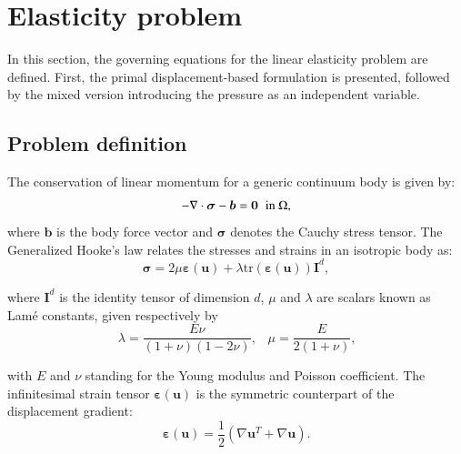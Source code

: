 \documentclass[english,11pt,3p,number,sort&compress]{elsarticle}
\begin{document}
\section{Elasticity problem \label{sec:Governing-equations}}

In this section, the governing equations for the linear elasticity problem are defined. First, the primal displacement-based formulation is presented, followed by the mixed version introducing the pressure as an independent variable.

\subsection{Problem definition}

The conservation of linear momentum for a generic continuum body is given by:
\begin{equation} \label{eq:momentum}
		-\nabla \cdot \bm{\sigma} - \bm{b} = \bm{0} \hspace{0.2cm} \text{in } \Omega ,
\end{equation}
\noindent where $\bm{b}$ is the body force vector and $\bm{\sigma}$ denotes the Cauchy stress tensor. The Generalized Hooke's law relates the stresses and strains in an isotropic body as:
\begin{equation} \label{eq:hook}
    \bm{\sigma} = 2\mu \bm{\varepsilon}(\bm{u}) + \lambda \text{tr}(\bm{\varepsilon}(\bm{u})) \bm{I}^d ,
\end{equation}

\noindent where $\bm{I}^d$ is the identity tensor of dimension $d$, $\mu$ and $\lambda$ are scalars known as Lam\'{e} constants, given respectively by
\begin{equation}
	\lambda = \frac{E\nu}{(1+\nu)(1-2\nu)} \text{,} \quad \mu = \frac{E}{2(1+\nu)} \text{,}
\end{equation}

\noindent with $E$ and $\nu$ standing for the Young modulus and Poisson coefficient. The infinitesimal strain tensor $\bm{\varepsilon}(\bm{u})$ is the symmetric counterpart of the displacement gradient:
\begin{equation} \label{eq:strain}
    \bm{\varepsilon}(\bm{u})=\frac{1}{2}(\nabla\bm{u}^T+\nabla\bm{u}) \text{.}
\end{equation}
\end{document}
